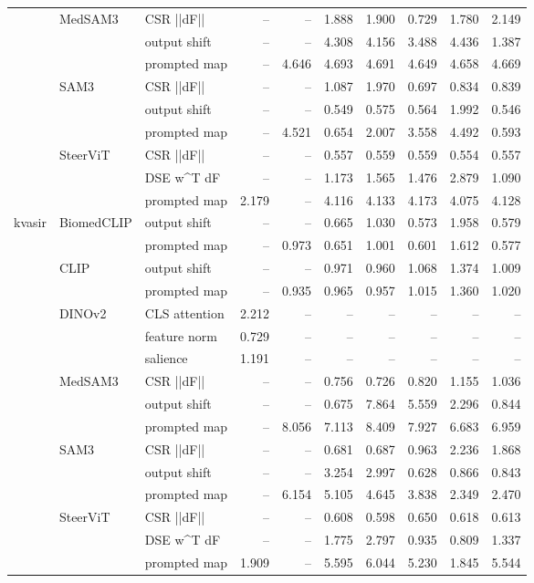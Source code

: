 \begin{tabular}{lllrrrrrrr}
\cline{2-10}
 & \multirow[t]{3}{*}{MedSAM3} & CSR  ||dF|| & -- & -- & 1.888 & 1.900 & 0.729 & 1.780 & 2.149 \\
 &  & output shift & -- & -- & 4.308 & 4.156 & 3.488 & 4.436 & 1.387 \\
 &  & prompted map & -- & 4.646 & 4.693 & 4.691 & 4.649 & 4.658 & 4.669 \\
\cline{2-10}
 & \multirow[t]{3}{*}{SAM3} & CSR  ||dF|| & -- & -- & 1.087 & 1.970 & 0.697 & 0.834 & 0.839 \\
 &  & output shift & -- & -- & 0.549 & 0.575 & 0.564 & 1.992 & 0.546 \\
 &  & prompted map & -- & 4.521 & 0.654 & 2.007 & 3.558 & 4.492 & 0.593 \\
\cline{2-10}
 & \multirow[t]{3}{*}{SteerViT} & CSR  ||dF|| & -- & -- & 0.557 & 0.559 & 0.559 & 0.554 & 0.557 \\
 &  & DSE  w^T dF & -- & -- & 1.173 & 1.565 & 1.476 & 2.879 & 1.090 \\
 &  & prompted map & 2.179 & -- & 4.116 & 4.133 & 4.173 & 4.075 & 4.128 \\
\cline{1-10} \cline{2-10}
\multirow[t]{16}{*}{kvasir} & \multirow[t]{2}{*}{BiomedCLIP} & output shift & -- & -- & 0.665 & 1.030 & 0.573 & 1.958 & 0.579 \\
 &  & prompted map & -- & 0.973 & 0.651 & 1.001 & 0.601 & 1.612 & 0.577 \\
\cline{2-10}
 & \multirow[t]{2}{*}{CLIP} & output shift & -- & -- & 0.971 & 0.960 & 1.068 & 1.374 & 1.009 \\
 &  & prompted map & -- & 0.935 & 0.965 & 0.957 & 1.015 & 1.360 & 1.020 \\
\cline{2-10}
 & \multirow[t]{3}{*}{DINOv2} & CLS attention & 2.212 & -- & -- & -- & -- & -- & -- \\
 &  & feature norm & 0.729 & -- & -- & -- & -- & -- & -- \\
 &  & salience & 1.191 & -- & -- & -- & -- & -- & -- \\
\cline{2-10}
 & \multirow[t]{3}{*}{MedSAM3} & CSR  ||dF|| & -- & -- & 0.756 & 0.726 & 0.820 & 1.155 & 1.036 \\
 &  & output shift & -- & -- & 0.675 & 7.864 & 5.559 & 2.296 & 0.844 \\
 &  & prompted map & -- & 8.056 & 7.113 & 8.409 & 7.927 & 6.683 & 6.959 \\
\cline{2-10}
 & \multirow[t]{3}{*}{SAM3} & CSR  ||dF|| & -- & -- & 0.681 & 0.687 & 0.963 & 2.236 & 1.868 \\
 &  & output shift & -- & -- & 3.254 & 2.997 & 0.628 & 0.866 & 0.843 \\
 &  & prompted map & -- & 6.154 & 5.105 & 4.645 & 3.838 & 2.349 & 2.470 \\
\cline{2-10}
 & \multirow[t]{3}{*}{SteerViT} & CSR  ||dF|| & -- & -- & 0.608 & 0.598 & 0.650 & 0.618 & 0.613 \\
 &  & DSE  w^T dF & -- & -- & 1.775 & 2.797 & 0.935 & 0.809 & 1.337 \\
 &  & prompted map & 1.909 & -- & 5.595 & 6.044 & 5.230 & 1.845 & 5.544 \\
\cline{1-10} \cline{2-10}
\bottomrule
\end{tabular}
